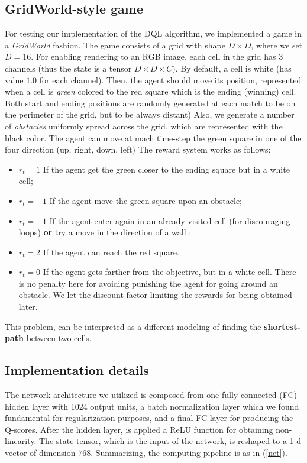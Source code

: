 \documentclass{article}
\begin{document}
\subsection{GridWorld-style game}
For testing our implementation of the DQL algorithm, we implemented a game in a \textit{GridWorld} fashion. The game consists of a grid with shape $D \times D$, where we set $D = 16$. For enabling rendering to an RGB image, each cell in the grid has $3$ channels (thus the state is a tensor $D \times D \times C$). By default, a cell is white (has value $1.0$ for each channel). Then, the agent should move its position, represented when a cell is \textit{green} colored to the red square which is the ending (winning) cell. Both start and ending positions are randomly generated at each match to be on the perimeter of the grid, but to be always distant)  Also, we generate a number of \textit{obstacles} uniformly spread across the grid, which are represented with the black color. The agent can move at mach time-step the green square in one of the four direction (up, right, down, left)
The reward system works as follows:
\begin{itemize}
	\item $r_t = 1$ If the agent get the green closer to the ending square but in a white cell;
	\item $r_t = -1$ If the agent move the green square upon an obstacle;
	\item $r_t = -1$ If the agent enter again in an already visited cell (for discouraging loops) \textbf{or} try a move in the direction of a wall ;
	\item $r_t = 2$ If the agent can reach the red square.
	\item $r_t = 0$ If the agent gets farther from the objective, but in a white cell. There is no penalty here for avoiding punishing the agent for going around an obstacle. We let the discount factor limiting the rewards for being obtained later.
\end{itemize}
This problem, can be interpreted as a different modeling of finding the \textbf{shortest-path} between two cells.

\subsection{Implementation details}
The network architecture we utilized is composed from one fully-connected (FC) hidden layer with 1024 output units, a batch normalization layer which we found fundamental for regularization purposes, and a final FC layer for producing the Q-scores. After the hidden layer, is applied a ReLU function for obtaining non-linearity. The state tensor, which is the input of the network, is reshaped to a 1-d vector of dimension $768$. Summarizing, the computing pipeline is as in (\ref{net}).
\end{document}

